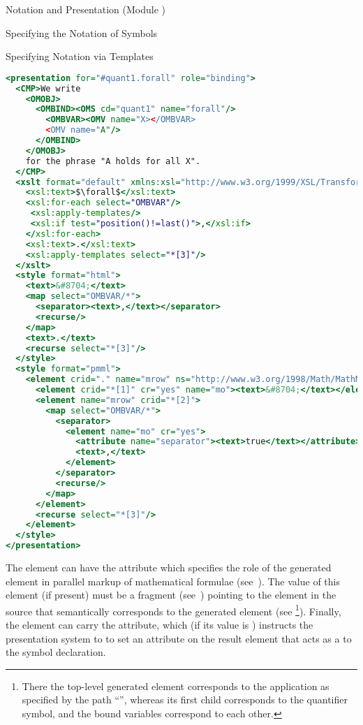 \begin{tchapter}[id=pres,short=Notation and Presentation]{Notation and Presentation (Module {})}
\begin{tsection}[id=presentation,short=Notation of Symbols]{Specifying the Notation of Symbols}
\begin{tsubsection}[id=pres-templates]{Specifying Notation via Templates}
\begin{lstlisting}[label=lst:presentation,language=XSLT,
  caption={A Simple {\element{presentation}} Element for the Universal Quantifier},mathescape,
  index={xsl:template,xsl:text,xsl:for-each,xsl:apply-templates,xsl:if}]
<presentation for="#quant1.forall" role="binding">
  <CMP>We write 
    <OMOBJ>
      <OMBIND><OMS cd="quant1" name="forall"/>
        <OMBVAR><OMV name="X></OMBVAR>
        <OMV name="A"/>
      </OMBIND>
    </OMOBJ>
    for the phrase "A holds for all X". 
  </CMP> 
  <xslt format="default" xmlns:xsl="http://www.w3.org/1999/XSL/Transform">
    <xsl:text>$\forall$</xsl:text>
    <xsl:for-each select="OMBVAR"/>
     <xsl:apply-templates/>
     <xsl:if test="position()!=last()">,</xsl:if>
    </xsl:for-each>
    <xsl:text>.</xsl:text>
    <xsl:apply-templates select="*[3]"/>
  </xslt>
  <style format="html">
    <text>&#8704;</text>
    <map select="OMBVAR/*">
      <separator><text>,</text></separator>
      <recurse/>
    </map>
    <text>.</text>
    <recurse select="*[3]"/>
  </style>
  <style format="pmml">
    <element crid="." name="mrow" ns="http://www.w3.org/1998/Math/MathML">
      <element crid="*[1]" cr="yes" name="mo"><text>&#8704;</text></element>
      <element name="mrow" crid="*[2]">
        <map select="OMBVAR/*">
          <separator>
            <element name="mo" cr="yes">
              <attribute name="separator"><text>true</text></attribute>
              <text>,</text>
            </element>
          </separator>
          <recurse/>
        </map>
      </element>
      <recurse select="*[3]"/>
    </element>
  </style>
</presentation>
\end{lstlisting}

  The {} element can have the {} attribute which
  specifies the role of the generated element in parallel markup of mathematical formulae
  (see~). The value of this element (if present) must be a
  {\xpath} fragment (see~\cite{ClaDeR:xpath99}) pointing to the element in the source that
  semantically corresponds to the generated element (see
  {}\footnote{There the top-level generated {}
    element corresponds to the application as specified by the path ``{}'',
    whereas its first child corresponds to the quantifier symbol, and the bound variables
    correspond to each other.}). Finally, the {} element can carry the
  {} attribute, which (if its value is {})
  instructs the presentation system to to set an {} attribute on the
  result element that acts as a {} to the symbol declaration.


\end{tsubsection}
\end{tsection}
\end{tchapter}
